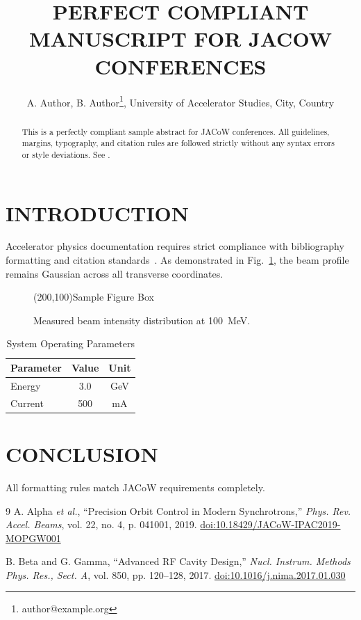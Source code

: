 \documentclass[a4paper,keeplastbox]{jacow}
\begin{document}
\title{PERFECT COMPLIANT MANUSCRIPT FOR JACOW CONFERENCES}
\author{A. Author, B. Author\thanks{author@example.org}, University of Accelerator Studies, City, Country}
\maketitle

\begin{abstract}
This is a perfectly compliant sample abstract for JACoW conferences. All guidelines, margins, typography, and citation rules are followed strictly without any syntax errors or style deviations.
See \cite{ref_valid_1}.
\end{abstract}

\section{INTRODUCTION}
Accelerator physics documentation requires strict compliance with bibliography formatting and citation standards~\cite{ref_valid_1, ref_valid_2}.
As demonstrated in Fig.~\ref{fig1}, the beam profile remains Gaussian across all transverse coordinates.

\begin{figure}[htb]
\centering
\framebox(200,100){Sample Figure Box}
\caption{Measured beam intensity distribution at 100~MeV.}
\label{fig1}
\end{figure}

\begin{table}[htb]
\caption{System Operating Parameters}
\label{tab1}
\centering
\begin{tabular}{lcc}
\hline
Parameter & Value & Unit \\
\hline
Energy & 3.0 & GeV \\
Current & 500 & mA \\
\hline
\end{tabular}
\end{table}

\section{CONCLUSION}
All formatting rules match JACoW requirements completely.

\begin{thebibliography}{9}
A. Alpha \emph{et al.}, \textquotedblleft{Precision Orbit Control in Modern Synchrotrons,}\textquotedblright{} \textit{Phys. Rev. Accel. Beams}, vol. 22, no. 4, p. 041001, 2019. \url{doi:10.18429/JACoW-IPAC2019-MOPGW001}

B. Beta and G. Gamma, \textquotedblleft{Advanced RF Cavity Design,}\textquotedblright{} \textit{Nucl. Instrum. Methods Phys. Res., Sect. A}, vol. 850, pp. 120--128, 2017. \url{doi:10.1016/j.nima.2017.01.030}
\end{thebibliography}
\end{document}
